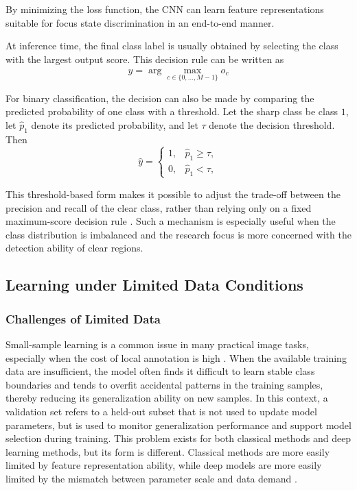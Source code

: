 \par By minimizing the loss function, the CNN can learn feature representations
suitable for focus state discrimination in an end-to-end manner.

\par At inference time, the final class label is usually obtained by selecting
the class with the largest output score. This decision rule can be written as
\begin{equation}
    \hat{y}=\arg\max_{c\in\{0,\dots,M-1\}} o_c
    \label{eq:argmax-basic}
\end{equation}
\par For binary classification, the decision can also be made by comparing the
predicted probability of one class with a threshold. Let the sharp class be
class $1$, let $\hat{p}_1$ denote its predicted probability, and let $\tau$
denote the decision threshold. Then
\begin{equation}
    \hat{y}=
    \begin{cases}
        1, & \hat{p}_1\ge \tau, \\
        0, & \hat{p}_1<\tau,
    \end{cases}
    \label{eq:binary-threshold-basic}
\end{equation}
\par This threshold-based form makes it possible to adjust the trade-off between
the precision and recall of the clear class, rather than relying only on a fixed
maximum-score decision rule \cite{davis2006relationship}. Such a mechanism is
especially useful when the class distribution is imbalanced and the research
focus is more concerned with the detection ability of clear regions.

\subsection{Learning under Limited Data Conditions}
\subsubsection{Challenges of Limited Data}
\par Small-sample learning is a common issue in many practical image tasks,
especially when the cost of local annotation is high \cite{shu2018small}. When
the available training data are insufficient, the model often finds it difficult
to learn stable class boundaries and tends to overfit accidental patterns in the
training samples, thereby reducing its generalization ability on new samples. In
this context, a validation set refers to a held-out subset that is not used to
update model parameters, but is used to monitor generalization performance and
support model selection during training. This problem exists for both classical
methods and deep learning methods, but its form is different. Classical methods
are more easily limited by feature representation ability, while deep models are
more easily limited by the mismatch between parameter scale and data demand
\cite[pp.~96--123]{goodfellow2016deep}.

